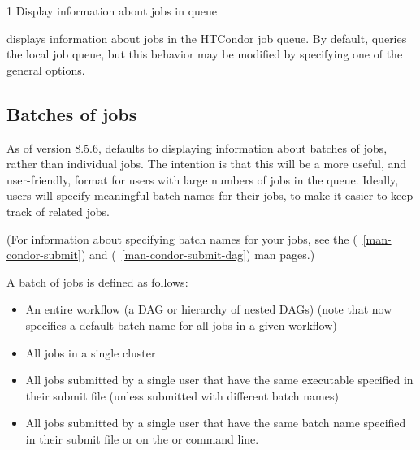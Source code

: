 \begin{ManPage}{\label{man-condor-q}}{1}
{Display information about jobs in queue}


\Synopsis {}

\ToolDebugOption
{}

\Description
{} displays information about jobs in the HTCondor job queue.  By
default,  queries the local job queue,
but this behavior may be 
modified by specifying one of the general options.



\subsection*{Batches of jobs}
As of version 8.5.6,  defaults to displaying information about
batches of jobs, rather than individual jobs.  The intention is that
this will be a more useful, and user-friendly, format for users with
large numbers of jobs in the queue.  Ideally, users will specify
meaningful batch names for their jobs, to make it easier to keep
track of related jobs.

(For information about specifying batch names for your jobs, see the
 (~\ref{man-condor-submit}) and 
(~\ref{man-condor-submit-dag}) man pages.)

A batch of jobs is defined as follows:
    \begin{itemize}
    \item An entire workflow (a DAG or hierarchy of nested DAGs)
      (note that  now specifies a default batch
      name for all jobs in a given workflow)
    \item All jobs in a single cluster
    \item All jobs submitted by a single user that have the same
      executable specified in their submit file (unless submitted
      with different batch names)
    \item All jobs submitted by a single user that have the same
      batch name specified in their submit file or on the 
      or  command line.
    \end{itemize}


\end{ManPage}
